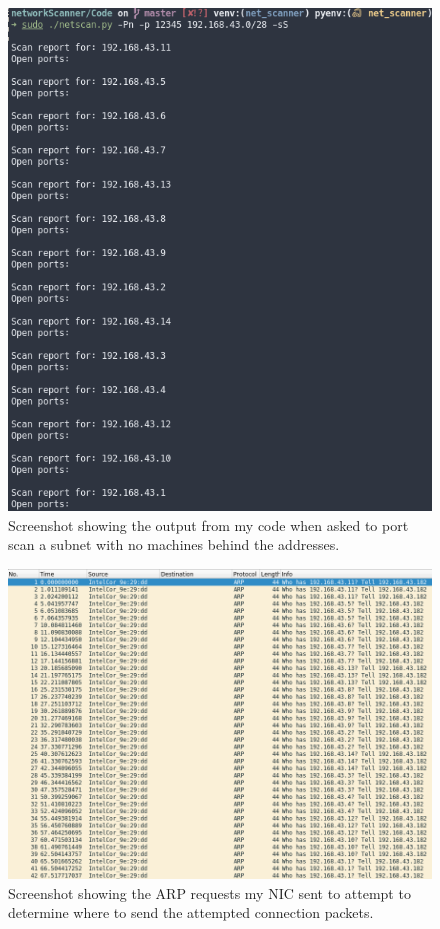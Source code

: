 \documentclass[titlepage]{article}
\begin{document}
\begin{figure}[H]
  \centering
  \includegraphics[width=\textwidth]{screenshots/nocheckhostoutput.png}
  \caption{%
    Screenshot showing the output from my code when asked to port scan a subnet
    with no machines behind the addresses.
  }\label{nocheckoutput}
\end{figure}

\begin{figure}[H]
  \centering
  \includegraphics[width=\textwidth]{screenshots/nocheckpcap.png}
  \caption{%
    Screenshot showing the ARP requests my NIC sent to attempt to determine
    where to send the attempted connection packets.
  }\label{nocheckwireshark}
\end{figure}
\end{document}

